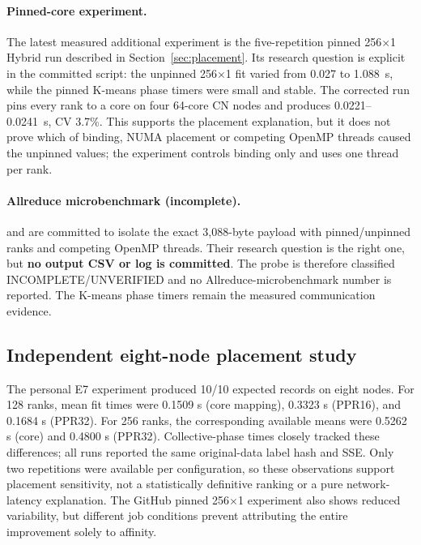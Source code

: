\documentclass[10pt,a4paper]{article}
\begin{document}
\paragraph{Pinned-core experiment.}
The latest measured additional experiment is the five-repetition pinned
256$\times$1 Hybrid run described in Section~\ref{sec:placement}. Its research
question is explicit in the committed script: the unpinned 256$\times$1 fit
varied from 0.027 to 1.088~s, while the pinned K-means phase timers were small
and stable. The corrected run pins every rank to a core on four 64-core CN
nodes and produces 0.0221--0.0241~s, CV 3.7\%. This supports the placement
explanation, but it does not prove which of binding, NUMA placement or
competing OpenMP threads caused the unpinned values; the experiment controls
binding only and uses one thread per rank.

\paragraph{Allreduce microbenchmark (incomplete).}
 and 
are committed to isolate the exact 3,088-byte payload with pinned/unpinned
ranks and competing OpenMP threads. Their research question is the right one,
but \textbf{no output CSV or log is committed}. The probe is therefore
classified INCOMPLETE/UNVERIFIED and no Allreduce-microbenchmark number is
reported. The K-means phase timers remain the measured communication evidence.

\subsection{Independent eight-node placement study}
The personal E7 experiment produced 10/10 expected records on eight nodes. For 128 ranks, mean fit times were 0.1509 s (core mapping), 0.3323 s (PPR16), and 0.1684 s (PPR32). For 256 ranks, the corresponding available means were 0.5262 s (core) and 0.4800 s (PPR32). Collective-phase times closely tracked these differences; all runs reported the same original-data label hash and SSE. Only two repetitions were available per configuration, so these observations support placement sensitivity, not a statistically definitive ranking or a pure network-latency explanation. The GitHub pinned 256$\times$1 experiment also shows reduced variability, but different job conditions prevent attributing the entire improvement solely to affinity.
\end{document}
